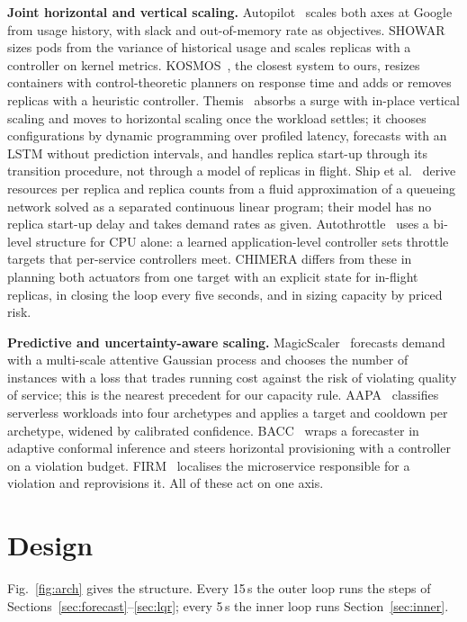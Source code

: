 \documentclass[conference]{IEEEtran}
\begin{document}
\textbf{Joint horizontal and vertical scaling.} Autopilot~\cite{autopilot} scales both
axes at Google from usage history, with slack and out-of-memory rate as objectives.
SHOWAR~\cite{showar} sizes pods from the variance of historical usage and scales replicas
with a controller on kernel metrics. KOSMOS~\cite{kosmos}, the closest system to ours,
resizes containers with control-theoretic planners on response time and adds or removes
replicas with a heuristic controller. Themis~\cite{themis} absorbs a surge with in-place
vertical scaling and moves to horizontal scaling once the workload settles; it chooses
configurations by dynamic programming over profiled latency, forecasts with an LSTM
without prediction intervals, and handles replica start-up through its transition
procedure, not through a model of replicas in flight. Ship et al.~\cite{ship} derive
resources per replica and replica counts from a fluid approximation of a queueing network
solved as a separated continuous linear program; their model has no replica start-up delay
and takes demand rates as given. Autothrottle~\cite{autothrottle} uses a bi-level
structure for CPU alone: a learned application-level controller sets throttle targets that
per-service controllers meet. CHIMERA differs from these in planning both actuators from
one target with an explicit state for in-flight replicas, in closing the loop every five
seconds, and in sizing capacity by priced risk.

\textbf{Predictive and uncertainty-aware scaling.} MagicScaler~\cite{magicscaler} forecasts
demand with a multi-scale attentive Gaussian process and chooses the number of instances
with a loss that trades running cost against the risk of violating quality of service;
this is the nearest precedent for our capacity rule. AAPA~\cite{aapa} classifies serverless
workloads into four archetypes and applies a target and cooldown per archetype, widened by
calibrated confidence. BACC~\cite{bacc} wraps a forecaster in adaptive conformal inference
and steers horizontal provisioning with a controller on a violation budget.
FIRM~\cite{firm} localises the microservice responsible for a violation and reprovisions
it. All of these act on one axis.

\section{Design}
\label{sec:design}

Fig.~\ref{fig:arch} gives the structure. Every 15\,s the outer loop runs the steps of
Sections~\ref{sec:forecast}--\ref{sec:lqr}; every 5\,s the inner loop runs
Section~\ref{sec:inner}.
\end{document}
